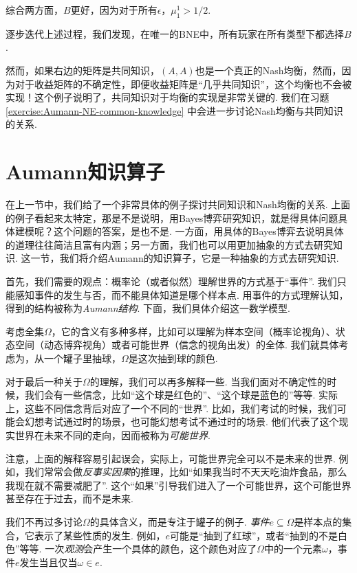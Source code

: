 综合两方面，$B$更好，因为对于所有$\epsilon$，$\mu_1^1 > 1/2$. 

逐步迭代上述过程，我们发现，在唯一的BNE中，所有玩家在所有类型下都选择$B$. 

然而，如果右边的矩阵是共同知识，$(A,A)$也是一个真正的Nash均衡，然而，因为对于收益矩阵的不确定性，即便收益矩阵是“几乎共同知识”，这个均衡也不会被实现！这个例子说明了，共同知识对于均衡的实现是非常关键的. 我们在习题 \ref{exercise:Aumann-NE-common-knowledge} 中会进一步讨论Nash均衡与共同知识的关系.

\section{Aumann知识算子}

在上一节中，我们给了一个非常具体的例子探讨共同知识和Nash均衡的关系. 上面的例子看起来太特定，那是不是说明，用Bayes博弈研究知识，就是得具体问题具体建模呢？这个问题的答案，是也不是. 一方面，用具体的Bayes博弈去说明具体的道理往往简洁且富有内涵；另一方面，我们也可以用更加抽象的方式去研究知识. 这一节，我们将介绍Aumann的知识算子，它是一种抽象的方式去研究知识.

首先，我们需要的观点：概率论（或者似然）理解世界的方式基于“事件”. 我们只能感知事件的发生与否，而不能具体知道是哪个样本点. 用事件的方式理解认知，得到的结构被称为\textit{Aumann结构}. 下面，我们具体介绍这一数学模型. 

考虑全集$\Omega$，它的含义有多种多样，比如可以理解为样本空间（概率论视角）、状态空间（动态博弈视角）或者可能世界（信念的视角出发）的全体. 我们就具体考虑为，从一个罐子里抽球，$\Omega$是这次抽到球的颜色. 

对于最后一种关于$\Omega$的理解，我们可以再多解释一些. 当我们面对不确定性的时候，我们会有一些信念，比如“这个球是红色的”、“这个球是蓝色的”等等. 实际上，这些不同信念背后对应了一个不同的“世界”. 比如，我们考试的时候，我们可能会幻想考试通过时的场景，也可能幻想考试不通过时的场景. 他们代表了这个现实世界在未来不同的走向，因而被称为\textit{可能世界}.

注意，上面的解释容易引起误会，实际上，可能世界完全可以不是未来的世界. 例如，我们常常会做\textit{反事实因果}的推理，比如“如果我当时不天天吃油炸食品，那么我现在就不需要减肥了”. 这个“如果”引导我们进入了一个可能世界，这个可能世界甚至存在于过去，而不是未来.

我们不再过多讨论$\Omega$的具体含义，而是专注于罐子的例子. \textit{事件}$e\subseteq \Omega$是样本点的集合，它表示了某些性质的发生. 例如，$e$可能是“抽到了红球”，或者“抽到的不是白色”等等. 一次\textit{观测}会产生一个具体的颜色，这个颜色对应了$\Omega$中的一个元素$\omega$，事件$e$发生当且仅当$\omega\in e$.

